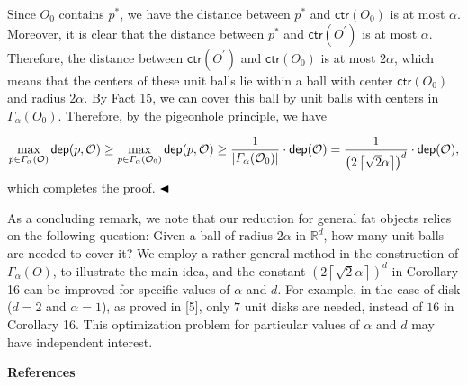 Since $O_{0}$ contains $p^{*}$, we have the distance between $p^{*}$ and $\mathsf{ctr}(O_{0})$ is at most $\alpha$. Moreover, it is clear that the distance between $p^{*}$ and $\mathsf{ctr}(O^{\prime})$ is at most $\alpha$. Therefore, the distance between $\mathsf{ctr}(O^{\prime})$ and $\mathsf{ctr}(O_{0})$ is at most $2\alpha$, which means that the centers of these unit balls lie within a ball with center $\mathsf{ctr}(O_{0})$ and radius $2\alpha$. By Fact 15, we can cover this ball by unit balls with centers in $\varGamma_{\alpha}(O_{0})$. Therefore, by the pigeonhole principle, we have
\par
\[\begin{aligned}
\max_{p\in\varGamma_{\alpha}(\mathcal{O})}\mathsf{dep}(p,\mathcal{O})\geq\max_%
{p\in\varGamma_{\alpha}(\mathcal{O}_{0})}\mathsf{dep}(p,\mathcal{O})\geq\frac{%
1}{|\varGamma_{\alpha}(\mathcal{O}_{0})|}\cdot\mathsf{dep}(\mathcal{O})=\frac{%
1}{{\left(2\left\lceil\sqrt{2}\alpha\right\rceil\right)}^{d}}\cdot\mathsf{dep}%
(\mathcal{O}),
\end{aligned}\]
which completes the proof. $\hfill\blacktriangleleft$
\par
\par
As a concluding remark, we note that our reduction for general fat objects relies on the following question: Given a ball of radius $2\alpha$ in $\mathbb{R}^{d}$, how many unit balls are needed to cover it? We employ a rather general method in the construction of $\varGamma_{\alpha}(O)$, to illustrate the main idea, and the constant ${\left(2\left\lceil\sqrt{2}\alpha\right\rceil\right)}^{d}$ in Corollary 16 can be improved for specific values of $\alpha$ and $d$. For example, in the case of disk ($d=2$ and $\alpha=1$), as proved in [5], only $7$ unit disks are needed, instead of $16$ in Corollary 16. This optimization problem for particular values of $\alpha$ and $d$ may have independent interest.
\par
\par
\par\medskip\noindent\textbf{References}\par
